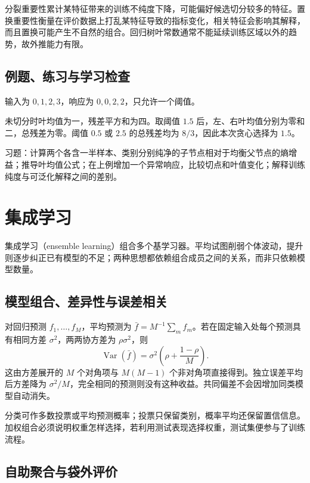 \documentclass[UTF8,12pt,a4paper,fontset=fandol]{ctexbook}
\begin{document}
分裂重要性累计某特征带来的训练不纯度下降，可能偏好候选切分较多的特征。置换重要性衡量在评价数据上打乱某特征导致的指标变化，相关特征会影响其解释，而且置换可能产生不自然的组合。回归树叶常数通常不能延续训练区域以外的趋势，故外推能力有限。

\section{例题、练习与学习检查}

\begin{example}[一个回归树切分]
输入为 $0,1,2,3$，响应为 $0,0,2,2$，只允许一个阈值。
\end{example}
\begin{solve}
未切分时叶均值为一，残差平方和为四。取阈值 $1.5$ 后，左、右叶均值分别为零和二，总残差为零。阈值 $0.5$ 或 $2.5$ 的总残差均为 $8/3$，因此本次贪心选择为 $1.5$。
\end{solve}

习题：计算两个各含一半样本、类别分别纯净的子节点相对于均衡父节点的熵增益；推导叶均值公式；在上例增加一个异常响应，比较切点和叶值变化；解释训练纯度与可泛化解释之间的差别。

\chapter{集成学习}
\label{chap:ml-ensembles}

集成学习（ensemble learning）组合多个基学习器。平均试图削弱个体波动，提升则逐步纠正已有模型的不足；两种思想都依赖组合成员之间的关系，而非只依赖模型数量。

\section{模型组合、差异性与误差相关}

对回归预测 $f_1,\ldots,f_M$，平均预测为 $\bar f=M^{-1}\sum_m f_m$。若在固定输入处每个预测具有相同方差 $\sigma^2$，两两协方差为 $\rho\sigma^2$，则
\[
 \operatorname{Var}(\bar f)=\sigma^2\left(\rho+\frac{1-\rho}{M}\right).
\]
这由方差展开的 $M$ 个对角项与 $M(M-1)$ 个非对角项直接得到。独立误差平均后方差降为 $\sigma^2/M$，完全相同的预测则没有这种收益。共同偏差不会因增加同类模型自动消失。

分类可作多数投票或平均预测概率；投票只保留类别，概率平均还保留置信信息。加权组合必须说明权重怎样选择，若利用测试表现选择权重，测试集便参与了训练流程。

\section{自助聚合与袋外评价}
\end{document}

